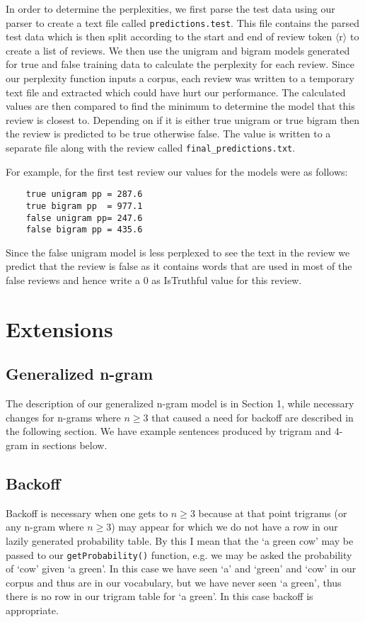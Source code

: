 \documentclass{article}
\begin{document}
In order to determine the perplexities, we first parse the test data using our parser to create a text file called \texttt{predictions.test}. This file contains the parsed test data which is then split according to the start and end of review token $\langle$r$\rangle$ to create a list of reviews. We then use the unigram and bigram models generated for true and false training data to calculate the perplexity for each review. Since our perplexity function inputs a corpus, each review was written to a temporary text file and extracted which could have hurt our performance. The calculated values are then compared to find the minimum to determine the model that this review is closest to. Depending on if it is either true unigram or true bigram then the review is predicted to be true otherwise false. The value is written to a separate file along with the review called \texttt{final\_predictions.txt}.\par

For example, for the first test review our values for the models were as follows:
{\small\begin{verbatim}
    true unigram pp = 287.6
    true bigram pp  = 977.1
    false unigram pp= 247.6
    false bigram pp = 435.6
\end{verbatim}}

Since the false unigram model is less perplexed to see the text in the review we predict that the review is false as it contains words that are used in most of the false reviews and hence write a 0 as IsTruthful value for this review.

\section{Extensions}

\subsection{Generalized n-gram}
The description of our generalized n-gram model is in Section 1, while necessary changes for n-grams where $n\geq3$ that caused a need for backoff are described in the following section. We have example sentences produced by trigram and 4-gram in sections below.

\subsection{Backoff}
Backoff is necessary when one gets to $n \geq 3$ because at that point trigrams (or any n-gram where $n \geq 3$) may appear for which we do not have a row in our lazily generated probability table. By this I mean that the `a green cow' may be passed to our \texttt{getProbability()} function, e.g. we may be asked the probability of `cow' given `a green'. In this case we have seen `a' and `green' and `cow' in our corpus and thus are in our vocabulary, but we have never seen `a green', thus there is no row in our trigram table for `a green'. In this case backoff is appropriate. 
\end{document}
